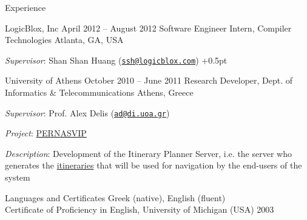 \documentclass{resume}
\begin{document}
\begin{rSection}{Experience}
\begin{rSubsection}{LogicBlox, Inc}
  {April 2012 -- August 2012}
  {Software Engineer Intern, Compiler Technologies}
  {Atlanta, GA, USA}
\item \emph{Supervisor}: Shan Shan Huang
  (\href{mailto:ssh@logicblox.com}{\nolinkurl{ssh@logicblox.com}})
\itemsep +0.5pt %
\end{rSubsection}

\begin{rSubsection}
  {University of Athens}
  {October 2010 -- June 2011}
  {Research Developer, Dept. of Informatics \& Telecommunications}
  {Athens, Greece}
\item \emph{Supervisor}: Prof. Alex Delis
  (\href{mailto:ad@di.uoa.gr}{\nolinkurl{ad@di.uoa.gr}})
\item \emph{Project}: \href{http://pernasvip.di.uoa.gr/index.php}{PERNASVIP}
\item \emph{Description}: Development of the Itinerary Planner Server,
  i.e. the server who generates the
  \href{http://pernasvip.di.uoa.gr/index.php/gen-spef/itinerary-example}{itineraries}
  that will be used for navigation by the end-users of the system
\end{rSubsection}

\end{rSection}

\newpage

\begin{rSection}{Languages and Certificates}
  Greek (native), English (fluent) \\
  Certificate of Proficiency in English, University of Michigan (USA)
  \hfill 2003
\end{rSection}
\end{document}
